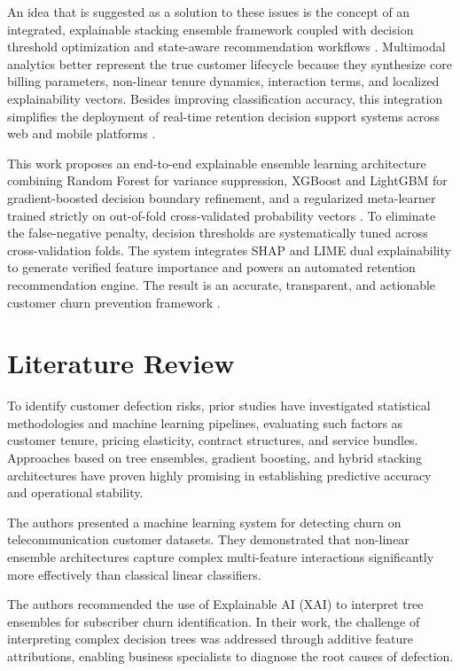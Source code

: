 \documentclass[conference]{IEEEtran}
\begin{document}
An idea that is suggested as a solution to these issues is the concept of an integrated, explainable stacking ensemble framework coupled with decision threshold optimization and state-aware recommendation workflows \cite{ref8}. Multimodal analytics better represent the true customer lifecycle because they synthesize core billing parameters, non-linear tenure dynamics, interaction terms, and localized explainability vectors. Besides improving classification accuracy, this integration simplifies the deployment of real-time retention decision support systems across web and mobile platforms \cite{ref9}.

This work proposes an end-to-end explainable ensemble learning architecture combining Random Forest for variance suppression, XGBoost and LightGBM for gradient-boosted decision boundary refinement, and a regularized meta-learner trained strictly on out-of-fold cross-validated probability vectors \cite{ref10}. To eliminate the false-negative penalty, decision thresholds are systematically tuned across cross-validation folds. The system integrates SHAP and LIME dual explainability to generate verified feature importance and powers an automated retention recommendation engine. The result is an accurate, transparent, and actionable customer churn prevention framework \cite{ref11}.

\section{Literature Review}
To identify customer defection risks, prior studies have investigated statistical methodologies and machine learning pipelines, evaluating such factors as customer tenure, pricing elasticity, contract structures, and service bundles. Approaches based on tree ensembles, gradient boosting, and hybrid stacking architectures have proven highly promising in establishing predictive accuracy and operational stability.

The authors \cite{ref12} presented a machine learning system for detecting churn on telecommunication customer datasets. They demonstrated that non-linear ensemble architectures capture complex multi-feature interactions significantly more effectively than classical linear classifiers.

The authors \cite{ref13} recommended the use of Explainable AI (XAI) to interpret tree ensembles for subscriber churn identification. In their work, the challenge of interpreting complex decision trees was addressed through additive feature attributions, enabling business specialists to diagnose the root causes of defection.
\end{document}
